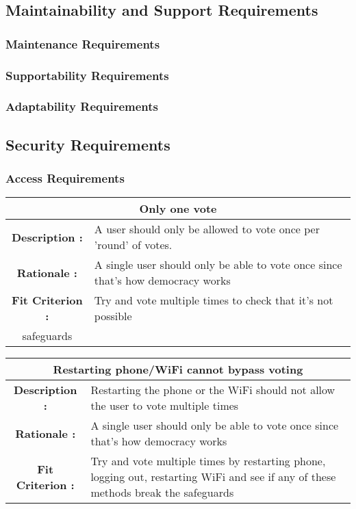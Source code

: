 \documentclass[12pt, titlepage]{article}
\begin{document}
\subsection{Maintainability and Support Requirements}
\subsubsection{Maintenance Requirements}
\subsubsection{Supportability Requirements}
\subsubsection{Adaptability Requirements}

\subsection{Security Requirements}
\subsubsection{Access Requirements}

\begin{center}
\begin{table}[H]
\begin{tabularx}{\textwidth}{| c X |}
\hline
\multicolumn{2}{|c|}{\textbf{Only one vote}}\\
\hline
\textbf{Description : } & A user should only be allowed to vote once per 'round'
of votes.\\
\hline
\textbf{Rationale : } & A single user should only be able to vote once since
that's how democracy works\\
\hline
\textbf{Fit Criterion : } & Try and vote multiple times to check that it's not
possible\\
safeguards\\
\hline
\end{tabularx}
\end{table}
\end{center}

\begin{center}
\begin{table}[H]
\begin{tabularx}{\textwidth}{| c X |}
\hline
\multicolumn{2}{|c|}{\textbf{Restarting phone/WiFi cannot bypass voting}}\\
\hline
\textbf{Description : } & Restarting the phone or the WiFi should not allow
the user to vote multiple times\\
\hline
\textbf{Rationale : } & A single user should only be able to vote once since
that's how democracy works\\
\hline
\textbf{Fit Criterion : } & Try and vote multiple times by restarting phone,
logging out, restarting WiFi and see if any of these methods break the
safeguards\\
\hline
\end{tabularx}
\end{table}
\end{center}
\end{document}
